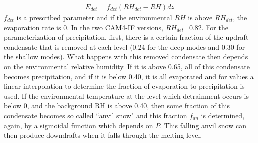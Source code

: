 \documentclass[letterpaper,12pt,titlepage,oneside,final]{book}
\begin{document}
\begin{align}
E_{det}=f_{det}(RH_{det}-RH)dz
\end{align}
$f_{det}$ is a prescribed parameter and if the environmental $RH$ is above $RH_{det}$, the evaporation rate is 0. In the two CAM4-IF versions, $RH_{det}$=0.82. For the parameterization of precipitation, first, there is a certain fraction of the updraft condensate that is removed at each level (0.24 for the deep modes and 0.30 for the shallow modes). What happens with this removed condensate then depends on the environmental relative humidity. If it is above 0.65, all of this condensate becomes precipitation, and if it is below 0.40, it is all evaporated and for values a linear interpolation to determine the fraction of evaporation to precipitation is used. If the environmental temperature at the level which detrainment occurs is below 0, and the background RH is above 0.40, then some fraction of this condensate becomes so called ``anvil snow" and this fraction $f_{an}$ is determined, again, by a sigmoidal function which depends on $P$. This falling anvil snow can then produce downdrafts when it falls through the melting level.
\end{document}
